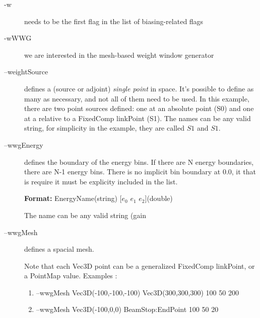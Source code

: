 \begin{description}
\item[-w] needs to be the first flag in the list of biasing-related flags
\item[-wWWG] we are interested in the mesh-based weight window generator

\item[--weightSource] defines a (source or adjoint) {\em single point}
  in space. It's possible to define as many as necessary, and not all
  of them need to be used.  In this example, there are two point
  sources defined: one at an absolute point (S0) and one at a relative
  to a FixedComp linkPoint (S1). The names can be any valid string,
  for simplicity in the example, they are called $S1$ and   $S1$.
  
\item[--wwgEnergy] defines the boundary of the energy bins. If there
  are N energy boundaries, there are N-1 energy bins.
  There is no implicit bin boundary at 0.0, it that is require it must
  be explicity  included in the list. 

  {\bf Format:} EnergyName(string) [$e_0$ $e_1$ $e_2$](double)

  The name can be any valid string (gain 
  
\item[--wwgMesh] defines a spacial mesh.
  Note that each Vec3D point can be a generalized FixedComp linkPoint, or
  a PointMap value.
  Examples :
  \begin{enumerate}
  \item --wwgMesh Vec3D(-100,-100,-100) Vec3D(300,300,300) 100 50 200
  \item --wwgMesh Vec3D(-100,0,0) BeamStop:EndPoint 100 50 20
  \end{enumerate}


\end{description}
